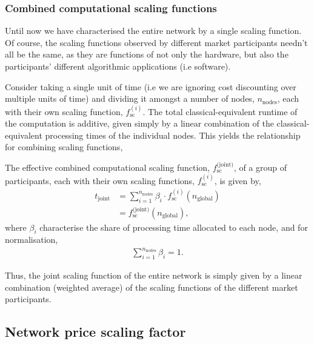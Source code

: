 \subsubsection{Combined computational scaling functions}\label{sec:comb_comp_sc_func}

Until now we have characterised the entire network by a single scaling function. Of course, the scaling functions observed by different market participants needn't all be the same, as they are functions of not only the hardware, but also the participants' different algorithmic applications (i.e software).

Consider taking a single unit of time (i.e we are ignoring cost discounting over multiple units of time) and dividing it amongst a number of nodes, $n_\text{nodes}$, each with their own scaling function, $f_\text{sc}^{(i)}$. The total classical-equivalent runtime of the computation is additive, given simply by a linear combination of the classical-equivalent processing times of the individual nodes. This yields the relationship for combining scaling functions,
\begin{definition}\label{def:comb_sc_func}
The effective combined computational scaling function, $f_\text{sc}^\text{(joint)}$, of a group of participants, each with their own scaling functions, $f_\text{sc}^{(i)}$, is given by,
\begin{align}
	t_\text{joint} &= \sum_{i=1}^{n_{\text{nodes}}} \beta_i \cdot f_\text{sc}^{(i)}(n_\text{global}) \nonumber \\
	&= f_\text{sc}^\text{(joint)}(n_\text{global}),
\end{align}
where $\beta_i$ characterise the share of processing time allocated to each node, and for normalisation,
\begin{align}
\sum_{i=1}^{n_\text{nodes}} \beta_i = 1.
\end{align}

\end{definition}

Thus, the joint scaling function of the entire network is simply given by a linear combination (weighted average) of the scaling functions of the different market participants.

%
%

\subsection{Network price scaling factor}\label{sec:NPSF}

